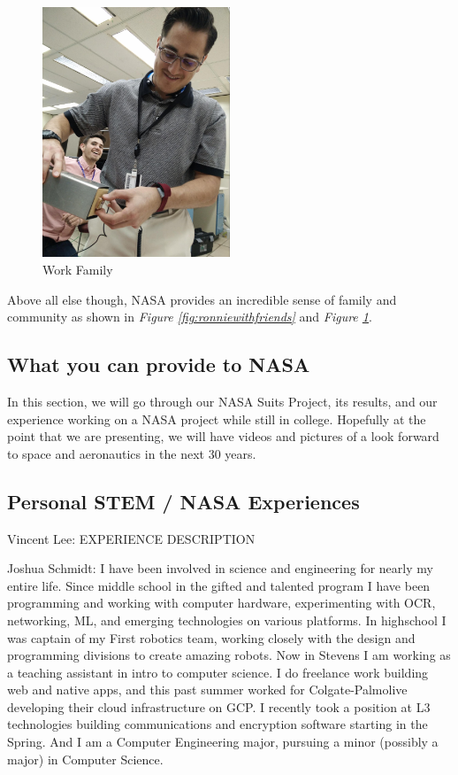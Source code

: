 \documentclass{article}
\let\Oldsubsection\subsection
\renewcommand{\subsection}{\FloatBarrier\Oldsubsection}
\begin{document}
\begin{figure}[!htb]
  \centering
  \includegraphics[width=0.5\textwidth]{assets/guywithpsu.jpg}
  \caption{Work Family}
  \label{fig:guywithpsu}
\end{figure}

Above all else though, NASA provides an incredible sense of family and community as shown in \textit{Figure \ref{fig:ronniewithfriends}} and \textit{Figure \ref{fig:guywithpsu}}.

\subsection{What you can provide to NASA}

In this section, we will go through our NASA Suits Project, its results, and our experience working on a NASA project while still in college. Hopefully at the point that we are presenting, we will have videos and pictures of a look forward to space and aeronautics in the next 30 years.

\subsection{Personal STEM / NASA Experiences}

Vincent Lee: EXPERIENCE DESCRIPTION

Joshua Schmidt: I have been involved in science and engineering for nearly my entire life. Since middle school in the gifted and talented program I have been programming and working with computer hardware, experimenting with OCR, networking, ML, and emerging technologies on various platforms. In highschool I was captain of my First robotics team, working closely with the design and programming divisions to create amazing robots. Now in Stevens I am working as a teaching assistant in intro to computer science. I do freelance work building web and native apps, and this past summer worked for Colgate-Palmolive developing their cloud infrastructure on GCP. I recently took a position at L3 technologies building communications and encryption software starting in the Spring. And I am a Computer Engineering major, pursuing a minor (possibly a major) in Computer Science.
\end{document}
